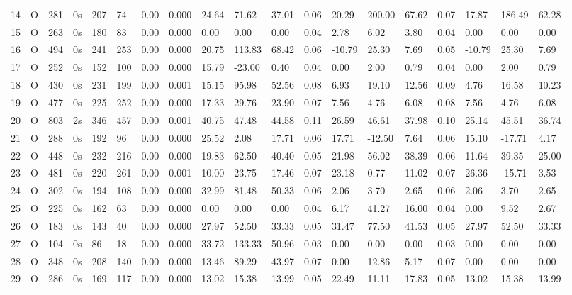 \begin{tabular}{rllllllrlllllllllll}
14 & O & 281 & 0s & 207 & 74 & 0.00 & 0.000 & 24.64 & 71.62 & 37.01 & 0.06 & 20.29 & 200.00 & 67.62 & 0.07 & 17.87 & 186.49 & 62.28 \\
15 & O & 263 & 0s & 180 & 83 & 0.00 & 0.000 & 0.00 & 0.00 & 0.00 & 0.04 & 2.78 & 6.02 & 3.80 & 0.04 & 0.00 & 0.00 & 0.00 \\
16 & O & 494 & 0s & 241 & 253 & 0.00 & 0.000 & 20.75 & 113.83 & 68.42 & 0.06 & -10.79 & 25.30 & 7.69 & 0.05 & -10.79 & 25.30 & 7.69 \\
17 & O & 252 & 0s & 152 & 100 & 0.00 & 0.000 & 15.79 & -23.00 & 0.40 & 0.04 & 0.00 & 2.00 & 0.79 & 0.04 & 0.00 & 2.00 & 0.79 \\
18 & O & 430 & 0s & 231 & 199 & 0.00 & 0.001 & 15.15 & 95.98 & 52.56 & 0.08 & 6.93 & 19.10 & 12.56 & 0.09 & 4.76 & 16.58 & 10.23 \\
19 & O & 477 & 0s & 225 & 252 & 0.00 & 0.000 & 17.33 & 29.76 & 23.90 & 0.07 & 7.56 & 4.76 & 6.08 & 0.08 & 7.56 & 4.76 & 6.08 \\
20 & O & 803 & 2s & 346 & 457 & 0.00 & 0.001 & 40.75 & 47.48 & 44.58 & 0.11 & 26.59 & 46.61 & 37.98 & 0.10 & 25.14 & 45.51 & 36.74 \\
21 & O & 288 & 0s & 192 & 96 & 0.00 & 0.000 & 25.52 & 2.08 & 17.71 & 0.06 & 17.71 & -12.50 & 7.64 & 0.06 & 15.10 & -17.71 & 4.17 \\
22 & O & 448 & 0s & 232 & 216 & 0.00 & 0.000 & 19.83 & 62.50 & 40.40 & 0.05 & 21.98 & 56.02 & 38.39 & 0.06 & 11.64 & 39.35 & 25.00 \\
23 & O & 481 & 0s & 220 & 261 & 0.00 & 0.001 & 10.00 & 23.75 & 17.46 & 0.07 & 23.18 & 0.77 & 11.02 & 0.07 & 26.36 & -15.71 & 3.53 \\
24 & O & 302 & 0s & 194 & 108 & 0.00 & 0.000 & 32.99 & 81.48 & 50.33 & 0.06 & 2.06 & 3.70 & 2.65 & 0.06 & 2.06 & 3.70 & 2.65 \\
25 & O & 225 & 0s & 162 & 63 & 0.00 & 0.000 & 0.00 & 0.00 & 0.00 & 0.04 & 6.17 & 41.27 & 16.00 & 0.04 & 0.00 & 9.52 & 2.67 \\
26 & O & 183 & 0s & 143 & 40 & 0.00 & 0.000 & 27.97 & 52.50 & 33.33 & 0.05 & 31.47 & 77.50 & 41.53 & 0.05 & 27.97 & 52.50 & 33.33 \\
27 & O & 104 & 0s & 86 & 18 & 0.00 & 0.000 & 33.72 & 133.33 & 50.96 & 0.03 & 0.00 & 0.00 & 0.00 & 0.03 & 0.00 & 0.00 & 0.00 \\
28 & O & 348 & 0s & 208 & 140 & 0.00 & 0.000 & 13.46 & 89.29 & 43.97 & 0.07 & 0.00 & 12.86 & 5.17 & 0.07 & 0.00 & 0.00 & 0.00 \\
29 & O & 286 & 0s & 169 & 117 & 0.00 & 0.000 & 13.02 & 15.38 & 13.99 & 0.05 & 22.49 & 11.11 & 17.83 & 0.05 & 13.02 & 15.38 & 13.99 \\

\end{tabular}
